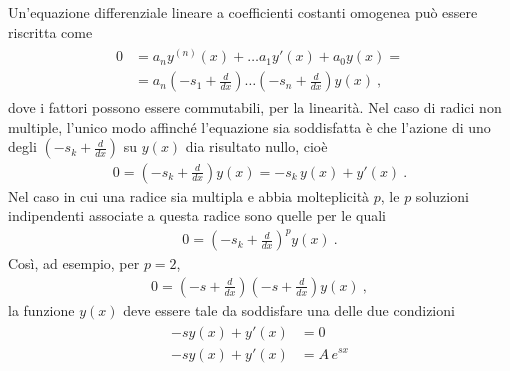 \documentclass[letterpaper,10pt,italian]{jupyterBook}
\begin{document}
\sphinxAtStartPar
Un’equazione differenziale lineare a coefficienti costanti omogenea può essere riscritta come
\begin{equation*}
\begin{split}\begin{aligned}
  0 & = a_n y^{(n)}(x) + \dots a_1 y'(x) + a_0 y(x) = \\
    & = a_n \left( - s_1 + \frac{d}{dx} \right) \dots \left( - s_n + \frac{d}{dx} \right) y(x) \ ,
\end{aligned}\end{split}
\end{equation*}
\sphinxAtStartPar
dove i fattori possono essere commutabili, per la linearità. Nel caso di radici non multiple, l’unico modo affinché l’equazione sia soddisfatta è che l’azione di uno degli  \(\left( - s_k + \frac{d}{dx} \right)\) su \(y(x)\) dia risultato nullo, cioè
\begin{equation*}
\begin{split}0 = \left(  - s_k + \frac{d}{dx} \right) y(x) = - s_k \, y(x) + y'(x) \ .\end{split}
\end{equation*}
\sphinxAtStartPar
Nel caso in cui una radice sia multipla e abbia molteplicità \(p\), le \(p\) soluzioni indipendenti associate a questa radice sono quelle per le quali
\begin{equation*}
\begin{split}0 = \left(  - s_k + \frac{d}{dx} \right)^p y(x) \ .\end{split}
\end{equation*}
\sphinxAtStartPar
Così, ad esempio, per \(p=2\),
\begin{equation*}
\begin{split}0 = \left( - s + \frac{d}{dx} \right) \left( -s + \frac{d}{dx} \right) y(x) \ ,\end{split}
\end{equation*}
\sphinxAtStartPar
la funzione \(y(x)\) deve essere tale da soddisfare una delle due condizioni
\begin{equation*}
\begin{split}\begin{aligned}
  - s y(x) + y'(x) & = 0 \\
  - s y(x) + y'(x) & = A \, e^{s x} \\
\end{aligned}\end{split}
\end{equation*}
\sphinxAtStartPar
\end{document}
